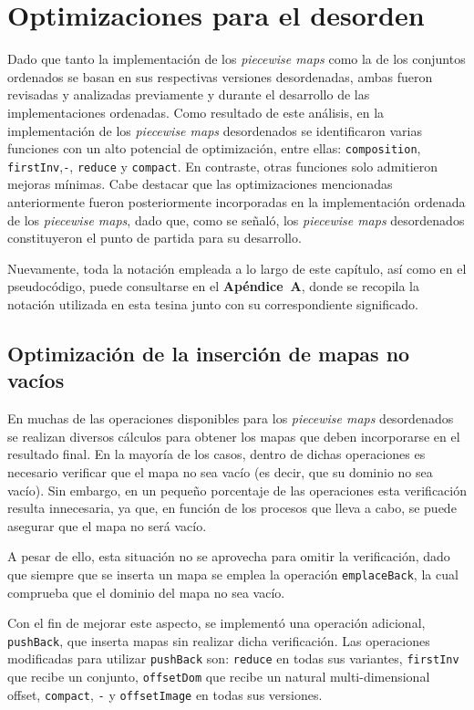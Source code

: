 \chapter{Optimizaciones para el desorden}

Dado que tanto la implementación de los \textit{piecewise maps} como la de los conjuntos ordenados se basan en sus respectivas versiones desordenadas, ambas fueron revisadas y analizadas previamente y durante el desarrollo de las implementaciones ordenadas. Como resultado de este análisis, en la implementación de los \textit{piecewise maps} desordenados se identificaron varias funciones con un alto potencial de optimización, entre ellas: \texttt{composition}, \texttt{firstInv},\texttt{-}, \texttt{reduce} y \texttt{compact}. En contraste, otras funciones solo admitieron mejoras mínimas. Cabe destacar que las optimizaciones mencionadas anteriormente fueron posteriormente incorporadas en la implementación ordenada de los \textit{piecewise maps}, dado que, como se señaló, los \textit{piecewise maps} desordenados constituyeron el punto de partida para su desarrollo.

Nuevamente, toda la notación empleada a lo largo de este capítulo, así como en el pseudocódigo, 
puede consultarse en el \textbf{Apéndice~A}, donde se recopila la notación utilizada en esta tesina 
junto con su correspondiente significado.

\section{Optimización de la inserción de mapas no vacíos}

En muchas de las operaciones disponibles para los \textit{piecewise maps} desordenados se realizan diversos cálculos para obtener los mapas que deben incorporarse en el resultado final. En la mayoría de los casos, dentro de dichas operaciones es necesario verificar que el mapa no sea vacío (es decir, que su dominio no sea vacío). Sin embargo, en un pequeño porcentaje de las operaciones esta verificación resulta innecesaria, ya que, en función de los procesos que lleva a cabo, se puede asegurar que el mapa no será vacío.

A pesar de ello, esta situación no se aprovecha para omitir la verificación, dado que siempre que se inserta un mapa se emplea la operación \texttt{emplaceBack}, la cual comprueba que el dominio del mapa no sea vacío.

Con el fin de mejorar este aspecto, se implementó una operación adicional, \texttt{pushBack}, que inserta mapas sin realizar dicha verificación. Las operaciones modificadas para utilizar \texttt{pushBack} son: \texttt{reduce} en todas sus variantes, \texttt{firstInv} que recibe un conjunto, \texttt{offsetDom} que recibe un natural multi-dimensional offset, \texttt{compact}, \texttt{-} y \texttt{offsetImage} en todas sus versiones.


